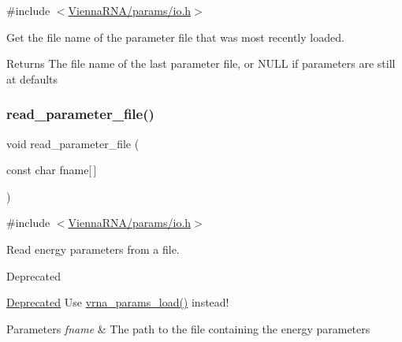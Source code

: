{\ttfamily \#include $<$\mbox{\hyperlink{io_8h}{Vienna\+R\+N\+A/params/io.\+h}}$>$}



Get the file name of the parameter file that was most recently loaded. 

\begin{DoxyReturn}{Returns}
The file name of the last parameter file, or N\+U\+LL if parameters are still at defaults 
\end{DoxyReturn}
\mbox{\label{group__energy__parameters__rw_ga165a142a3c68fb6655c69ef4ab7cd749}} 
\subsubsection{\texorpdfstring{read\_parameter\_file()}{read\_parameter\_file()}}
{\footnotesize\ttfamily void read\+\_\+parameter\+\_\+file (\begin{DoxyParamCaption}\item[{const char}]{fname\mbox{[}$\,$\mbox{]} }\end{DoxyParamCaption})}



{\ttfamily \#include $<$\mbox{\hyperlink{io_8h}{Vienna\+R\+N\+A/params/io.\+h}}$>$}



Read energy parameters from a file. 

\begin{DoxyRefDesc}{Deprecated}
\item[\mbox{\hyperlink{deprecated__deprecated000150}{Deprecated}}]Use \mbox{\hyperlink{group__energy__parameters__rw_gabb0583595c67094986ef90cb4f1c7555}{vrna\+\_\+params\+\_\+load()}} instead! \end{DoxyRefDesc}

\begin{DoxyParams}{Parameters}
{\em fname} & The path to the file containing the energy parameters \\
\hline
\end{DoxyParams}
\mbox{\label{group__energy__parameters__rw_ga8a43459be386a7489feeab68dc2c6c76}} 
